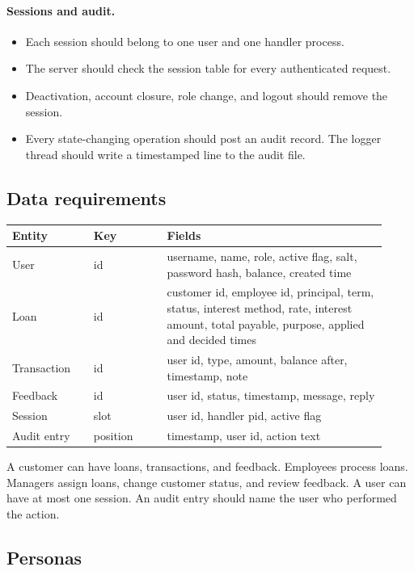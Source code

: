\documentclass[11pt,a4paper]{article}
\begin{document}
\paragraph{Sessions and audit.}
\begin{itemize}
\item Each session should belong to one user and one handler process.
\item The server should check the session table for every authenticated request.
\item Deactivation, account closure, role change, and logout should remove the session.
\item Every state-changing operation should post an audit record. The logger thread should write a timestamped line to the audit file.
\end{itemize}

\subsection{Data requirements}

\begin{longtable}{L{0.20\linewidth}L{0.18\linewidth}L{0.54\linewidth}}
\hline
Entity & Key & Fields \\
\hline
\endhead
User & id & username, name, role, active flag, salt, password hash, balance, created time \\
Loan & id & customer id, employee id, principal, term, status, interest method, rate, interest amount, total payable, purpose, applied and decided times \\
Transaction & id & user id, type, amount, balance after, timestamp, note \\
Feedback & id & user id, status, timestamp, message, reply \\
Session & slot & user id, handler pid, active flag \\
Audit entry & position & timestamp, user id, action text \\
\hline
\end{longtable}

A customer can have loans, transactions, and feedback. Employees process loans. Managers assign loans, change customer status, and review feedback. A user can have at most one session. An audit entry should name the user who performed the action.

\subsection{Personas}
\end{document}

